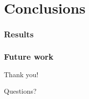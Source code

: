 \section{Conclusions}
\label{sec:conclusions}
    \frame{\sectionpage}

    \begin{frame}
        \frametitle{Results}
    \end{frame}

    \begin{frame}
        \frametitle{Future work}
    \end{frame}


    \begin{frame}[plain]
        \begin{center}
            \par{\Huge{Thank you!}}
            \vspace{2.0cm}
            \par{\Huge{Questions?}}
        \end{center}
    \end{frame}
